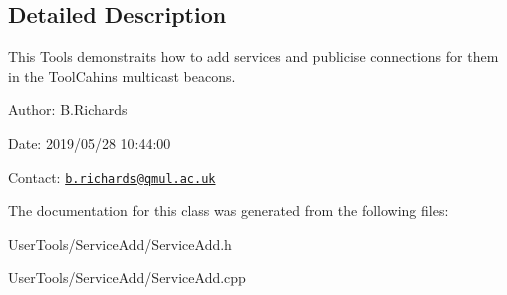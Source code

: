 \subsection{Detailed Description}
This Tools demonstraits how to add services and publicise connections for them in the Tool\-Cahins multicast beacons.

\begin{DoxyParagraph}{Author\-:}
B.\-Richards 
\end{DoxyParagraph}
\begin{DoxyParagraph}{Date\-:}
2019/05/28 10\-:44\-:00 
\end{DoxyParagraph}
Contact\-: \href{mailto:b.richards@qmul.ac.uk}{\tt b.\-richards@qmul.\-ac.\-uk} 

The documentation for this class was generated from the following files\-:\begin{DoxyCompactItemize}
\item 
User\-Tools/\-Service\-Add/Service\-Add.\-h\item 
User\-Tools/\-Service\-Add/Service\-Add.\-cpp\end{DoxyCompactItemize}
